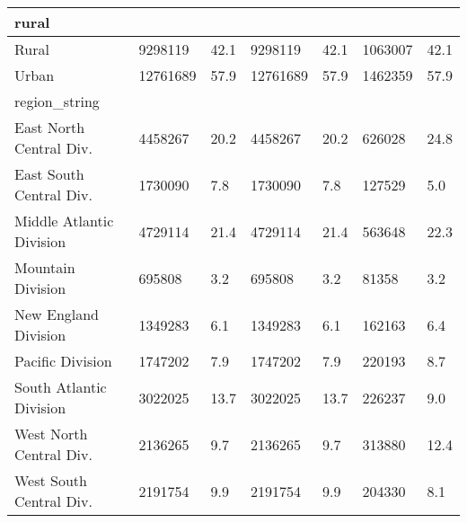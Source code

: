 \begin{longtable}{lllllll}
\midrule
\multicolumn{1}{l}{rural} \\ 
\midrule
Rural & 9298119 & 42.1 & 9298119 & 42.1 & 1063007 & 42.1 \\ 
Urban & 12761689 & 57.9 & 12761689 & 57.9 & 1462359 & 57.9 \\ 
\midrule
\multicolumn{1}{l}{region\_string} \\ 
\midrule
East North Central Div. & 4458267 & 20.2 & 4458267 & 20.2 & 626028 & 24.8 \\ 
East South Central Div. & 1730090 & 7.8 & 1730090 & 7.8 & 127529 & 5.0 \\ 
Middle Atlantic Division & 4729114 & 21.4 & 4729114 & 21.4 & 563648 & 22.3 \\ 
Mountain Division & 695808 & 3.2 & 695808 & 3.2 & 81358 & 3.2 \\ 
New England Division & 1349283 & 6.1 & 1349283 & 6.1 & 162163 & 6.4 \\ 
Pacific Division & 1747202 & 7.9 & 1747202 & 7.9 & 220193 & 8.7 \\ 
South Atlantic Division & 3022025 & 13.7 & 3022025 & 13.7 & 226237 & 9.0 \\ 
West North Central Div. & 2136265 & 9.7 & 2136265 & 9.7 & 313880 & 12.4 \\ 
West South Central Div. & 2191754 & 9.9 & 2191754 & 9.9 & 204330 & 8.1 \\ 
\bottomrule
\end{longtable}

